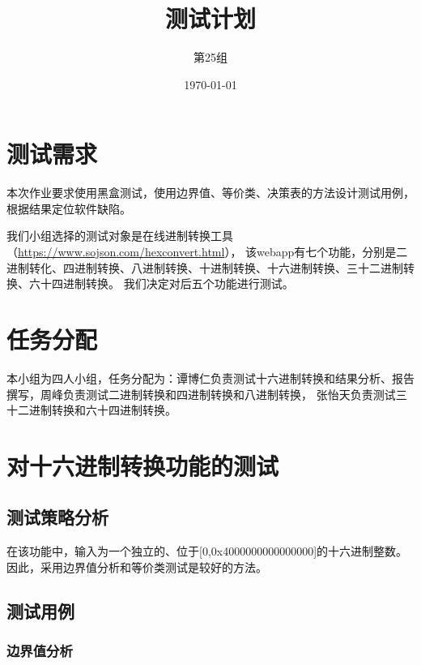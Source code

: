 \documentclass[12pt, a4paper, oneside]{ctexart}
\title{\textbf{测试计划}}
\author{第25组}
\date{\today}
\begin{document}
\maketitle
\section{测试需求}
本次作业要求使用黑盒测试，使用边界值、等价类、决策表的方法设计测试用例，根据结果定位软件缺陷。

我们小组选择的测试对象是在线进制转换工具（\url{https://www.sojson.com/hexconvert.html}），
该webapp有七个功能，分别是二进制转化、四进制转换、八进制转换、十进制转换、十六进制转换、三十二进制转换、六十四进制转换。
我们决定对后五个功能进行测试。

\section{任务分配}
本小组为四人小组，任务分配为：谭博仁负责测试十六进制转换和结果分析、报告撰写，周峰负责测试二进制转换和四进制转换和八进制转换，
张怡天负责测试三十二进制转换和六十四进制转换。


\section{对十六进制转换功能的测试}

\subsection{测试策略分析}

在该功能中，输入为一个独立的、位于[0,0x4000000000000000]的十六进制整数。因此，采用边界值分析和等价类测试是较好的方法。

\subsection{测试用例}

\subsubsection{边界值分析}
\end{document}
